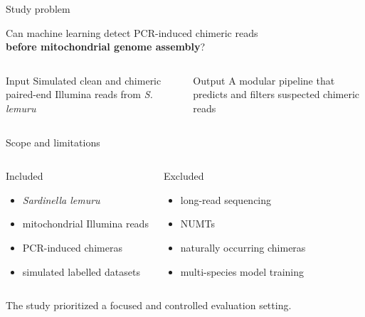 \documentclass[aspectratio=169,11pt]{beamer}
\newcommand{\keyword}[1]{\textcolor{MitoBlue}{\textbf{#1}}}
\begin{document}
\begin{frame}{Study problem}

\begin{center}
\Large
Can machine learning detect PCR-induced chimeric reads\\
\keyword{before mitochondrial genome assembly}?
\end{center}

\vspace{1.5em}

\begin{columns}[T]
\begin{block}{Input}
Simulated clean and chimeric paired-end Illumina reads from \textit{S. lemuru}
\end{block}

\begin{block}{Output}
A modular pipeline that predicts and filters suspected chimeric reads
\end{block}
\end{columns}

\end{frame}

\begin{frame}{Scope and limitations}

\begin{columns}[T]
\begin{block}{Included}
\begin{itemize}
    \item \textit{Sardinella lemuru}
    \item mitochondrial Illumina reads
    \item PCR-induced chimeras
    \item simulated labelled datasets
\end{itemize}
\end{block}

\begin{block}{Excluded}
\begin{itemize}
    \item long-read sequencing
    \item NUMTs
    \item naturally occurring chimeras
    \item multi-species model training
\end{itemize}
\end{block}
\end{columns}

\vspace{0.9em}
\centering
\large
The study prioritized a focused and controlled evaluation setting.

\end{frame}
\end{document}
